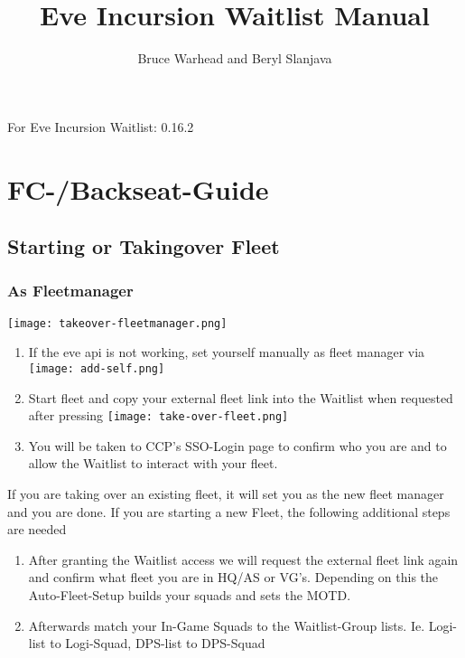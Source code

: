 \documentclass[oneside,a4paper]{article}
\title{Eve Incursion Waitlist Manual}
\author{Bruce Warhead and Beryl Slanjava}
\newcommand{\wlversion}{0.16.2}
\newcommand{\guidefor}{For Eve Incursion Waitlist: \wlversion\xspace}
\begin{document}
\maketitle
\begin{center}
\guidefor
\end{center}


\tableofcontents

\newpage


\section{FC-/Backseat-Guide}
\subsection{Starting or Takingover Fleet}
\subsubsection{As Fleetmanager}
\texttt{[image: takeover-fleetmanager.png]}
\begin{enumerate}
	\item If the eve api is not working, set yourself manually as fleet manager via \texttt{[image: add-self.png]}
	\item Start fleet and copy your external fleet link into the Waitlist when requested after pressing \texttt{[image: take-over-fleet.png]}
	\item  You will be taken to CCP's SSO-Login page to confirm who you are and to allow the Waitlist to interact with your fleet.
\end{enumerate}
If you are taking over an existing fleet, it will set you as the new fleet manager and you are done.
If you are starting a new Fleet, the following additional steps are needed
\begin{enumerate}
	\item After granting the Waitlist access we will request the external fleet link again and confirm what fleet you are in HQ/AS or VG’s. Depending on this the Auto-Fleet-Setup builds your squads and sets the MOTD.	
	\item Afterwards match your In-Game Squads to the Waitlist-Group lists. Ie. Logi-list to Logi-Squad, DPS-list to DPS-Squad
\end{enumerate}
\end{document}
